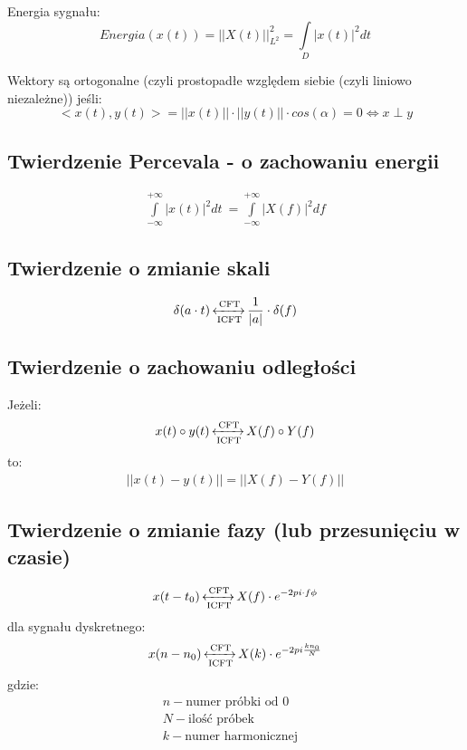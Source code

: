     \noindent
    Energia sygnału:
    \begin{equation*}
        Energia(x(t)) = ||X(t)||^2_{L^2} = \int\limits_D |x(t)|^2dt
    \end{equation*}

    \noindent
    Wektory są ortogonalne (czyli prostopadłe względem siebie (czyli liniowo niezależne)) jeśli:
    \begin{equation*}
        <x(t), y(t)> = ||x(t)|| \cdot ||y(t)|| \cdot cos(\alpha) = 0 \Leftrightarrow x\perp y
    \end{equation*}


    \subsection{Twierdzenie Percevala - o zachowaniu energii}
        \begin{gather*}
            \int\limits^{+\infty}_{-\infty}|x(t)|^2 dt\ = \int\limits^{+\infty}_{-\infty}|X(f)|^2df
        \end{gather*}
    \subsection{Twierdzenie o zmianie skali}
        \begin{gather*}
            \delta(a\cdot t) \operatorname{\xleftrightarrow[\text{ICFT}]{\text{CFT}}} \frac{1}{|a|}\cdot\delta(f)
        \end{gather*}
    \subsection{Twierdzenie o zachowaniu odległości}
        Jeżeli:
        \begin{gather*}
            x(t)\circ y(t) \operatorname{\xleftrightarrow[\text{ICFT}]{\text{CFT}}} X(f)\circ Y(f)
        \end{gather*}
        to:
        \begin{gather*}
            ||x(t) - y(t)|| = ||X(f) - Y(f)||
        \end{gather*}
    \subsection{Twierdzenie o zmianie fazy (lub przesunięciu w czasie)}
        \begin{align*}
            x(t-t_0) \operatorname{\xleftrightarrow[\text{ICFT}]{\text{CFT}}} X(f) \cdot e^{-2pi\cdot f \phi}
        \end{align*}
        dla sygnału dyskretnego:
        \begin{align*}
            x(n-n_0) \operatorname{\xleftrightarrow[\text{ICFT}]{\text{CFT}}} X(k) \cdot e^{-2pi \frac{kn_0}{N}}
        \end{align*}
        gdzie:
        \begin{align*}
            &n - \text{numer próbki od 0}&&\\
            &N - \text{ilość próbek}\\
            &k - \text{numer harmonicznej}\\
        \end{align*}
        
